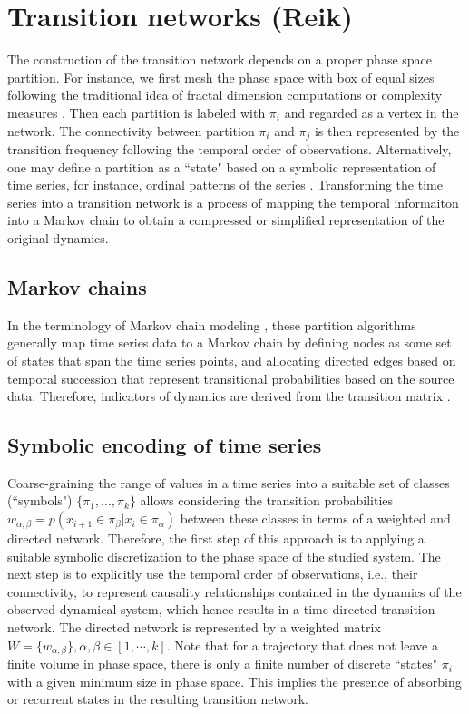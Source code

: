\section{Transition networks {\bf{(Reik)}} } \label{sec:TransitionNt}
The construction of the transition network depends on a proper phase space partition. For instance, we first mesh the phase space with box of equal sizes following the traditional idea of fractal dimension computations \cite{Grassberger1983PRL,Grassberger1983PLA} or complexity measures \cite{Crutchfield1989}. Then each partition is labeled with $\pi_i$ and regarded as a vertex in the network. The connectivity between partition $\pi_i$ and $\pi_j$ is then represented by the transition frequency following the temporal order of observations. Alternatively, one may define a partition as a ``state" based on a symbolic representation of time series, for instance, ordinal patterns of the series \cite{Li2008,McCullough2015}. Transforming the time series into a transition network is a process of mapping the temporal informaiton into a Markov chain to obtain a compressed or simplified representation of the original dynamics. 

	\subsection{Markov chains}
	In the terminology of Markov chain modeling \cite{Nicolis2005}, these partition algorithms generally map time series data to a Markov chain by defining nodes as some set of states that span the time series points, and allocating directed edges based on temporal succession that represent transitional probabilities based on the source data. Therefore, indicators of dynamics are derived from the transition matrix \cite{Nicolis2005}. 
	
	\subsection{Symbolic encoding of time series}
	Coarse-graining the range of values in a time series into a suitable set of classes (``symbols") $\{\pi_1, \dots , \pi_k \}$ allows considering the transition probabilities $w_{\alpha,\beta} = p (x_{i+1} \in \pi_\beta | x_i \in \pi_\alpha)$ between these classes in terms of a weighted and directed network. Therefore, the first step of this approach is to applying a suitable symbolic discretization to the phase space of the studied system. The next step is to explicitly use the temporal order of observations, i.e., their connectivity, to represent causality relationships contained in the dynamics of the observed dynamical system, which hence results in a time directed transition network. The directed network is represented by a weighted matrix $W = \{w_{\alpha, \beta} \}, \alpha, \beta \in [1, \cdots, k]$. Note that for a trajectory that does not leave a finite volume in phase space, there is only a finite number of discrete ``states" $\pi_i$ with a given minimum size in phase space. This implies the presence of absorbing or recurrent states in the resulting transition network. 
	
